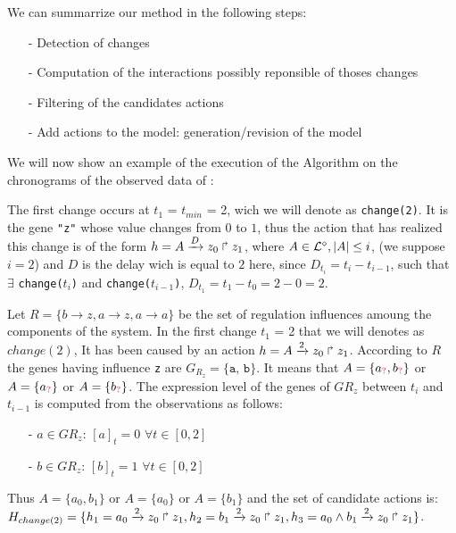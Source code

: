 We can summarrize our method in the following steps:
\begin{itemize}
\item[-] Detection of changes
\item[-] Computation of the interactions possibly reponsible of thoses changes
\item[-] Filtering of the candidates actions
\item[-] Add actions to the model: generation/revision of the model
\end{itemize}


We will now show an example of the execution of the Algorithm  on the chronograms of the observed data of :


The first change occurs at $t_1$ = $t_{min}$ = 2,
wich we will denote as \texttt{change(2)}. It is the gene \texttt{"z"} whose value changes from $0$ to $1$, thus the action that has realized this change is of the form $h = A\xrightarrow{D} z_0 \Rsh z_1$,
where $ A \in \mathcal{L}^{\diamond}, | A| \leq i$, (we suppose $i=2$) and $D$ is the delay wich is equal to $2$ here, since
$D_{t_i}=t_i - t_{i-1}$, such that $\exists$ \texttt{change($t_i$)} and \texttt{change($t_{i-1}$)},
$D_{t_1}= t_1 - t_0 = 2 - 0 = 2$.

Let $R=\{ b \rightarrow z, a \rightarrow z, a \rightarrow a \}$
be the set of regulation influences amoung the components of the system.
%
In the first change $t_1$ = 2 that we will denotes as $change(2)$,
It has been caused by an action $h = A\xrightarrow{2} z_0 \Rsh z_1$. According to $R$ the genes having influence \texttt{z} are $G_{R_z} = \{\texttt{a, b}\}$. It means that $A= \{ a_{\textcolor{red}{?}}, b_{\textcolor{red}{?}} \} $ or $A= \{ a_{\textcolor{red}{?}} \} $ or $A= \{ b_{\textcolor{red}{?}} \} $.
%
The expression level of the genes of $G{R_z}$ between $t_i$ and $t_{i-1}$ is computed from the observations as follows:
\begin{itemize}
\item[-] $a \in  G{R_z}$: $[a]_t=0$ $\forall t \in [0,2] $
\item[-] $b \in  G{R_z}$: $[b]_t=1$ $\forall t \in [0,2] $
\end{itemize}
%
Thus $A= \{ a_0, b_1 \} $ or $A= \{ a_0\} $ or $A= \{ b_1 \} $ and the set of candidate actions is:
$H_{change(2)} = \{ h_1=a_0\xrightarrow{2} z_0 \Rsh z_1
, h_2=b_1\xrightarrow{2} z_0 \Rsh z_1
, h_3=a_0 \wedge b_1 \xrightarrow{2} z_0 \Rsh z_1 \}$.

